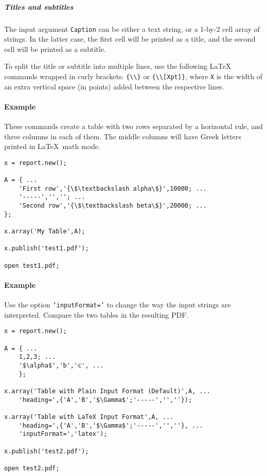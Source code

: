 \subparagraph{Titles and subtitles}

The input argument \texttt{Caption} can be either a text string, or a
1-by-2 cell array of strings. In the latter case, the first cell will be
printed as a title, and the second cell will be printed as a subtitle.

To split the title or subtitle into multiple lines, use the following
LaTeX commands wrapped in curly brackets:
\texttt{\{\textbackslash{}\textbackslash{}\}} or
\texttt{\{\textbackslash{}\textbackslash{}{[}Xpt{]}\}}, where \texttt{X}
is the width of an extra vertical space (in points) added between the
respective lines.

\paragraph{Example}

These commands create a table with two rows separated by a horizontal
rule, and three columns in each of them. The middle columns will have
Greek letters printed in \LaTeX~math mode.

\begin{verbatim}
x = report.new();

A = { ...
    'First row','{\$\textbackslash alpha\$}',10000; ...
    '-----','',''; ...
    'Second row','{\$\textbackslash beta\$}',20000; ...
};

x.array('My Table',A);

x.publish('test1.pdf');

open test1.pdf;
\end{verbatim}

\paragraph{Example}

Use the option \texttt{'inputFormat='} to change the way the input
strings are interpreted. Compare the two tables in the resulting PDF.

\begin{verbatim}
x = report.new();

A = { ...
    1,2,3; ...
    '$\alpha$','b','c', ...
    };

x.array('Table with Plain Input Format (Default)',A, ...
    'heading=',{'A','B','$\Gamma$';'-----','',''});

x.array('Table with LaTeX Input Format',A, ...
    'heading=',{'A','B','$\Gamma$';'-----','',''}, ...
    'inputFormat=','latex');

x.publish('test2.pdf');

open test2.pdf;
\end{verbatim}


